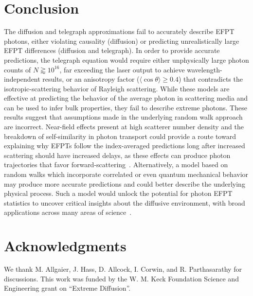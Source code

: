 \section{Conclusion}
The diffusion and telegraph approximations fail to accurately describe EFPT photons, either violating causality (diffusion) or predicting unrealistically large EFPT differences (diffusion and telegraph). In order to provide accurate predictions, the telegraph equation  would require either unphysically large photon counts of $N \gtrapprox 10^{16}$, far exceeding the laser output to achieve wavelength-independent results, or an anisotropy factor ($\langle \cos {\theta} \rangle \geq 0.4$) that contradicts the isotropic-scattering behavior of Rayleigh scattering. While these models are effective at predicting the behavior of the average photon in scattering media and can be used to infer bulk properties, they fail to describe extreme photons. These results suggest that assumptions made in the underlying random walk approach are incorrect. Near-field effects present at high scatterer number density and the breakdown of self-similarity in photon transport could provide a route toward explaining why EFPTs follow the index-averaged predictions long after increased scattering should have increased delays, as these effects can produce photon trajectories that favor forward-scattering~\cite{pattelli_role_2018,pattelli_experimental_2022,pini_non-self-similar_2024,rezvani_naraghi_near-field_2015}. Alternatively, a model based on random walks which incorporate correlated or even quantum mechanical behavior may produce more accurate predictions and could better describe the underlying physical process. Such a model would unlock the potential for photon EFPT statistics to uncover critical insights about the diffusive environment, with broad applications across many areas of science~\cite{redner_guide_2001,weiss_applications_2002,godec_first_2016,grebenkov_molecular_2021,polizzi_mean_2016,barney_first-passage-time_2017,zsurkis_first_2024,lawley_distribution_2020,lawley_slowest_2023,schuss_redundancy_2019,meerson_mortality_2015,chun_heterogeneous_2023}.

\section{Acknowledgments}
We thank M. Allgaier, J. Hass, D. Allcock, I. Corwin, and R. Parthasarathy for discussions. This work was funded by the W. M. Keck Foundation Science and Engineering grant on ``Extreme Diffusion''.

